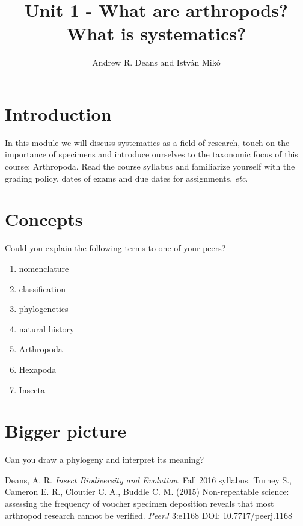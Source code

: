 \documentclass[11pt,letterpaper]{article}
\title{Unit 1 - What are arthropods? What is systematics?}
\author{Andrew R. Deans and Istv\'an Mik\'o}
\begin{document}
\cleanlookdateon %
\maketitle
\thispagestyle{fancy}
\section*{Introduction}
In this module we will discuss systematics as a field of research, touch on the importance of specimens \cite{voucher} and introduce ourselves to the taxonomic focus of this course: Arthropoda. Read the course syllabus \cite{syllabus} and familiarize yourself with the grading policy, dates of exams and due dates for assignments, \textit{etc}.
\section*{Concepts}
Could you explain the following terms to one of your peers?

\begin{enumerate} 
\item{nomenclature} 
\item{classification}  
\item{phylogenetics}  
\item{natural history}
\item{Arthropoda}  
\item{Hexapoda}  
\item{Insecta}  
\end{enumerate}

\section*{Bigger picture}
Can you draw a phylogeny and interpret its meaning?

\begin{thebibliography}{9}%
 Deans, A. R. \textit{Insect Biodiversity and Evolution}. Fall 2016 syllabus.
 Turney S., Cameron E. R., Cloutier C. A., Buddle C. M. (2015) Non-repeatable science: assessing the frequency of voucher specimen deposition reveals that most arthropod research cannot be verified. \textit{PeerJ} 3:e1168 DOI: 10.7717/peerj.1168
\end{thebibliography}
\end{document}
